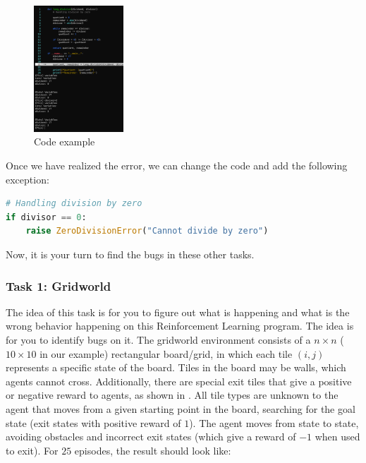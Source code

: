 \begin{figure}[H]
    \centering
    \includegraphics[width=0.3\textwidth]{figures/code_changes.png}
    \caption{Code example}
    \label{fig:code-example}
\end{figure}

Once we have realized the error, we can change the code and add the following exception:

\begin{lstlisting}[language=Python]
# Handling division by zero
if divisor == 0:
    raise ZeroDivisionError("Cannot divide by zero")
\end{lstlisting}

Now, it is your turn to find the bugs in these other tasks.

\subsubsection{Task 1: Gridworld}

The idea of this task is for you to figure out what is happening and what is the wrong behavior happening 
on this Reinforcement Learning program. The idea is for you to identify bugs on it. The gridworld 
environment consists of a $n\times n$ ($10\times 10$ in our example) rectangular board/grid, in which each tile $(i,j)$ 
represents a specific state of the board. Tiles in the board may be walls, which agents cannot cross. 
Additionally, there are special exit tiles that give a positive or negative reward to agents, as shown in 
. All tile types are unknown to the agent that moves from a given starting point in 
the board, searching for the goal state (\ie exit states with positive reward of $1$). The agent 
moves from state to state, avoiding obstacles and incorrect exit states (which give a reward of $-1$ 
when used to exit). For $25$ episodes, the result should look like:


